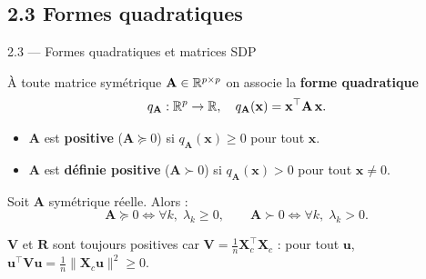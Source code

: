 \subsection{2.3 Formes quadratiques}
\begin{frame}{2.3 — Formes quadratiques et matrices SDP}
\begin{definition}
À toute matrice symétrique $\mathbf{A} \in \mathbb{R}^{p\times p}$ on associe la
\textbf{forme quadratique}
\[
q_{\mathbf{A}} : \mathbb{R}^p \to \mathbb{R}, \quad
q_{\mathbf{A}}(\mathbf{x}) = \mathbf{x}^\top \mathbf{A}\, \mathbf{x}.
\]
\end{definition}

\begin{definition}
\begin{itemize}
  \item $\mathbf{A}$ est \textbf{positive} ($\mathbf{A} \succeq 0$) si $q_{\mathbf{A}}(\mathbf{x}) \geq 0$ pour tout $\mathbf{x}$.
  \item $\mathbf{A}$ est \textbf{définie positive} ($\mathbf{A} \succ 0$) si $q_{\mathbf{A}}(\mathbf{x}) > 0$ pour tout $\mathbf{x} \neq 0$.
\end{itemize}
\end{definition}

\begin{theorem}
Soit $\mathbf{A}$ symétrique réelle. Alors :
\[
\mathbf{A} \succeq 0 \iff \forall k, \; \lambda_k \geq 0,
\qquad
\mathbf{A} \succ 0 \iff \forall k, \; \lambda_k > 0.
\]
\end{theorem}

\begin{rema}
$\mathbf{V}$ et $\mathbf{R}$ sont \alert{toujours} positives car
$\mathbf{V} = \frac{1}{n}\mathbf{X}_c^\top \mathbf{X}_c$ : pour tout $\mathbf{u}$,
$\mathbf{u}^\top \mathbf{V} \mathbf{u} = \frac{1}{n}\|\mathbf{X}_c \mathbf{u}\|^2 \geq 0$.
\end{rema}
\end{frame}

